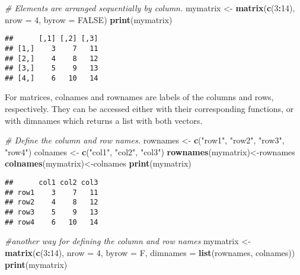 \documentclass[]{book}
\newenvironment{Shaded}{\begin{snugshade}}{\end{snugshade}}
\newcommand{\KeywordTok}[1]{\textcolor[rgb]{0.13,0.29,0.53}{\textbf{#1}}}
\newcommand{\DataTypeTok}[1]{\textcolor[rgb]{0.13,0.29,0.53}{#1}}
\newcommand{\DecValTok}[1]{\textcolor[rgb]{0.00,0.00,0.81}{#1}}
\newcommand{\StringTok}[1]{\textcolor[rgb]{0.31,0.60,0.02}{#1}}
\newcommand{\CommentTok}[1]{\textcolor[rgb]{0.56,0.35,0.01}{\textit{#1}}}
\newcommand{\OtherTok}[1]{\textcolor[rgb]{0.56,0.35,0.01}{#1}}
\newcommand{\OperatorTok}[1]{\textcolor[rgb]{0.81,0.36,0.00}{\textbf{#1}}}
\newcommand{\NormalTok}[1]{#1}
\theoremstyle{definition}
\theoremstyle{definition}
\theoremstyle{definition}
\theoremstyle{remark}
\begin{document}
\begin{Shaded}
\begin{Highlighting}[]
\CommentTok{# Elements are arranged sequentially by column.}
\NormalTok{mymatrix <-}\StringTok{ }\KeywordTok{matrix}\NormalTok{(}\KeywordTok{c}\NormalTok{(}\DecValTok{3}\OperatorTok{:}\DecValTok{14}\NormalTok{), }\DataTypeTok{nrow =} \DecValTok{4}\NormalTok{, }\DataTypeTok{byrow =} \OtherTok{FALSE}\NormalTok{)}
\KeywordTok{print}\NormalTok{(mymatrix)}
\end{Highlighting}
\end{Shaded}

\begin{verbatim}
##      [,1] [,2] [,3]
## [1,]    3    7   11
## [2,]    4    8   12
## [3,]    5    9   13
## [4,]    6   10   14
\end{verbatim}

For matrices, colnames and rownames are labels of the columns and rows,
respectively. They can be accessed either with their corresponding
functions, or with dimnames which returns a list with both vectors.

\begin{Shaded}
\begin{Highlighting}[]
\CommentTok{# Define the column and row names.}
\NormalTok{rownames <-}\StringTok{ }\KeywordTok{c}\NormalTok{(}\StringTok{"row1"}\NormalTok{, }\StringTok{"row2"}\NormalTok{, }\StringTok{"row3"}\NormalTok{, }\StringTok{"row4"}\NormalTok{)}
\NormalTok{colnames <-}\StringTok{ }\KeywordTok{c}\NormalTok{(}\StringTok{"col1"}\NormalTok{, }\StringTok{"col2"}\NormalTok{, }\StringTok{"col3"}\NormalTok{)}
\KeywordTok{rownames}\NormalTok{(mymatrix)<-rownames}
\KeywordTok{colnames}\NormalTok{(mymatrix)<-colnames}
\KeywordTok{print}\NormalTok{(mymatrix)}
\end{Highlighting}
\end{Shaded}

\begin{verbatim}
##      col1 col2 col3
## row1    3    7   11
## row2    4    8   12
## row3    5    9   13
## row4    6   10   14
\end{verbatim}

\begin{Shaded}
\begin{Highlighting}[]
\CommentTok{#another way for defining the column and row names}
\NormalTok{mymatrix <-}\StringTok{ }\KeywordTok{matrix}\NormalTok{(}\KeywordTok{c}\NormalTok{(}\DecValTok{3}\OperatorTok{:}\DecValTok{14}\NormalTok{), }\DataTypeTok{nrow =} \DecValTok{4}\NormalTok{, }\DataTypeTok{byrow =}\NormalTok{ F, }\DataTypeTok{dimnames =} \KeywordTok{list}\NormalTok{(rownames, colnames))}
\KeywordTok{print}\NormalTok{(mymatrix)}
\end{Highlighting}
\end{Shaded}
\end{document}

